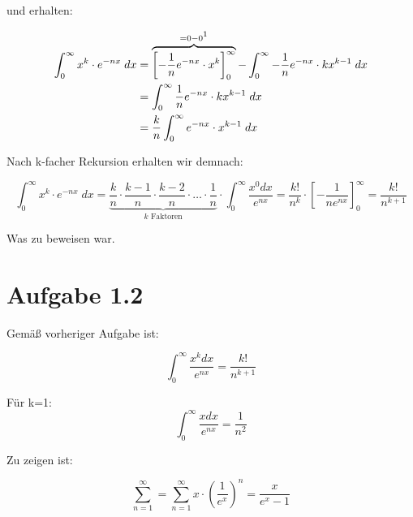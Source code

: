 \documentclass[a4paper,german,12pt,smallheadings]{scrartcl}
\begin{document}
und erhalten:

\begin{align*}
  \int_0^\infty x^k \cdot e^{-nx} \; dx  &= \overbrace{\left[-\frac{1}{n} e^{-nx} \cdot x^k\right]_0^\infty}^{=0-0\footnotemark[1]} - \int_0^\infty -\frac{1}{n}e^{-nx} \cdot kx^{k-1} \; dx \\
                                         &= \int_0^\infty \frac{1}{n}e^{-nx} \cdot kx^{k-1} \; dx \\
                                         &= \frac{k}{n} \int_0^\infty e^{-nx} \cdot x^{k-1} \; dx
\end{align*}


Nach k-facher Rekursion erhalten wir demnach:

\begin{equation*}
  \int_0^\infty x^k \cdot e^{-nx} \; dx = \underbrace{\frac{k}{n} \cdot \frac{k-1}{n} \cdot \frac{k-2}{n} \cdot \dots \cdot \frac{1}{n}}_{k\text{ Faktoren}} \cdot  \int_{0}^{\infty} \frac{x^0dx}{e^{nx}}= \frac{k!}{n^k}\cdot\left[-\frac{1}{ne^{nx}}\right]_0^\infty=\frac{k!}{n^{k+1}}
\end{equation*}

Was zu beweisen war.


\section*{Aufgabe 1.2}

Gemäß vorheriger Aufgabe ist:

\begin{equation*}
\int_{0}^{\infty}\frac{x^kdx}{e^{nx}}=\frac{k!}{n^{k+1}}
\end{equation*}

Für k=1:
\begin{equation*}
\int_{0}^{\infty}\frac{xdx}{e^{nx}}=\frac{1}{n^2}
\end{equation*}

Zu zeigen ist:

\begin{equation*}
\sum_{n=1}^{\infty}=\sum_{n=1}^{\infty}x\cdot\left(\frac{1}{e^x}\right)^n=\frac{x}{e^x-1}
\end{equation*}
\end{document}
